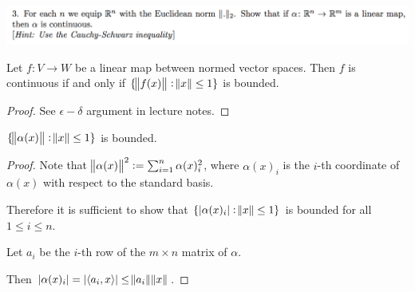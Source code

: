 \documentclass[12pt]{article}
\begin{document}
\newpage
\subsection{}
\begin{mdframed}
\includegraphics[width=400pt]{img/oxford-a2-1-3.png}
\end{mdframed}

\begin{lemma*}
  Let $f:V \to W$ be a linear map between normed vector spaces. Then $f$ is continuous if and only
  if $\{\norm{f(x)} : \norm{x} \leq 1\}$ is bounded.
\end{lemma*}

\begin{proof}
  See $\epsilon-\delta$ argument in lecture notes.
\end{proof}






\begin{claim*}
  $\{\norm{\alpha(x)} : \norm{x} \leq 1\}$ is bounded. 
\end{claim*}

\begin{proof}
  Note that $\norm{\alpha(x)}^2 := \sum_{i=1}^n \alpha(x)_i^2$, where $\alpha(x)_i$ is the $i$-th
  coordinate of $\alpha(x)$ with respect to the standard basis.

Therefore it is sufficient to show that $\{|\alpha(x)_i| : \norm{x} \leq 1\}$ is bounded for all
$1 \leq i \leq n$.

Let $a_i$ be the $i$-th row of the $m \times n$ matrix of $\alpha$.

Then $|\alpha(x)_i| = |\langle a_i, x \rangle| \leq \norm{a_i}\norm{x}$.
\end{proof}
\end{document}
